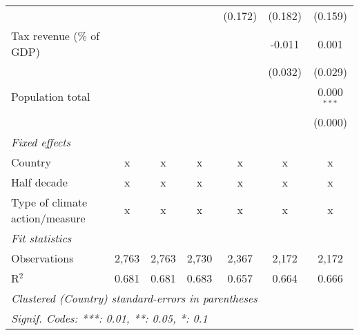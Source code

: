 \begin{tabular}{lcccccc}
                                                 &               &               &                & (0.172)        & (0.182)        & (0.159)\\   
   Tax revenue (\% of GDP)                       &               &               &                &                & -0.011         & 0.001\\   
                                                 &               &               &                &                & (0.032)        & (0.029)\\   
   Population total                              &               &               &                &                &                & 0.000$^{***}$\\   
                                                 &               &               &                &                &                & (0.000)\\   
   \emph{Fixed effects}\\
   Country                                       & x             & x             & x              & x              & x              & x\\  
   Half decade                                   & x             & x             & x              & x              & x              & x\\  
   Type of climate action/measure                & x             & x             & x              & x              & x              & x\\  
   \midrule \emph{Fit statistics}\\
   Observations                                  & 2,763         & 2,763         & 2,730          & 2,367          & 2,172          & 2,172\\  
   R$^2$                                         & 0.681         & 0.681         & 0.683          & 0.657          & 0.664          & 0.666\\  
   \midrule
   \multicolumn{7}{l}{\emph{Clustered (Country) standard-errors in parentheses}}\\
   \multicolumn{7}{l}{\emph{Signif. Codes: ***: 0.01, **: 0.05, *: 0.1}}\\
\end{tabular}
\par\endgroup


